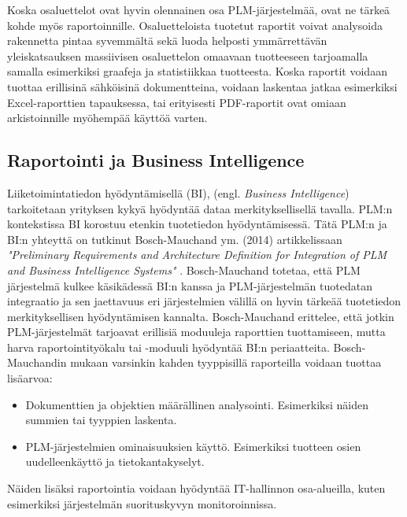 Koska osaluettelot ovat hyvin olennainen osa PLM-järjestelmää, ovat ne tärkeä kohde myös raportoinnille. \cite{german_challenge_2016} Osaluetteloista tuotetut raportit voivat analysoida rakennetta pintaa syvemmältä sekä luoda helposti ymmärrettävän yleiskatsauksen massiivisen osaluettelon omaavaan tuotteeseen tarjoamalla samalla esimerkiksi graafeja ja statistiikkaa tuotteesta. Koska raportit voidaan tuottaa erillisinä sähköisinä dokumentteina, voidaan laskentaa jatkaa esimerkiksi Excel-raporttien tapauksessa, tai erityisesti PDF-raportit ovat omiaan arkistoinnille myöhempää käyttöä varten.

\subsection{Raportointi ja Business Intelligence} \label{Raportointi ja Business Intelligence}

Liiketoimintatiedon hyödyntämisellä (BI), (engl. \textit{Business Intelligence}) tarkoitetaan yrityksen kykyä hyödyntää dataa merkityksellisellä tavalla. PLM:n kontekstissa BI korostuu etenkin tuotetiedon hyödyntämisessä. Tätä PLM:n ja BI:n yhteyttä on tutkinut Bosch-Mauchand ym. (2014) artikkelissaan \textit{"Preliminary Requirements and Architecture Definition for Integration of PLM and Business Intelligence Systems"}  \cite{bayro-corrochano_preliminary_2014}. Bosch-Mauchand totetaa, että PLM järjestelmä kulkee käsikädessä BI:n kanssa ja PLM-järjestelmän tuotedatan integraatio ja sen jaettavuus eri järjestelmien välillä on hyvin tärkeää tuotetiedon merkityksellisen hyödyntämisen kannalta.
Bosch-Mauchand erittelee, että jotkin PLM-järjestelmät tarjoavat erillisiä moduuleja raporttien tuottamiseen, mutta harva raportointityökalu tai -moduuli hyödyntää BI:n periaatteita. Bosch-Mauchandin mukaan varsinkin kahden tyyppisillä raporteilla voidaan tuottaa lisäarvoa:  \cite{bayro-corrochano_preliminary_2014}
\begin{itemize}
\item Dokumenttien ja objektien määrällinen analysointi. Esimerkiksi näiden summien tai tyyppien laskenta.
\item PLM-järjestelmien ominaisuuksien käyttö. Esimerkiksi tuotteen osien uudelleenkäyttö ja tietokantakyselyt.
\end{itemize}
Näiden lisäksi raportointia voidaan hyödyntää IT-hallinnon osa-alueilla, kuten esimerkiksi järjestelmän suorituskyvyn monitoroinnissa.

